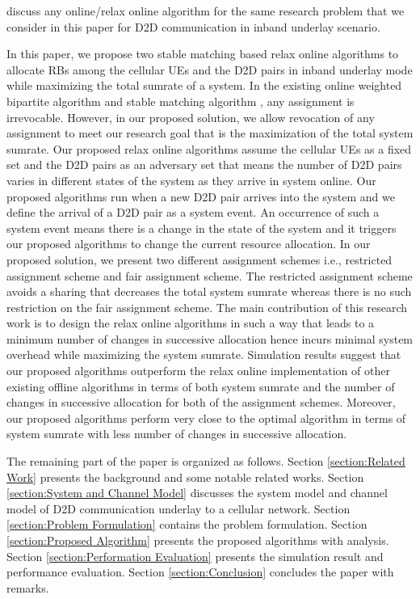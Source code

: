\documentclass[times]{dacauth}
\begin{document}
discuss any online/relax online algorithm for the same research problem that we consider in this paper for D2D communication in inband underlay scenario.

\smallskip 
\noindent
In this paper, we propose two stable matching \cite{knuth1976mariages} based relax online algorithms to allocate RBs among the cellular UEs and the D2D pairs in inband underlay mode while maximizing the total sumrate of a system. In the existing online   weighted bipartite algorithm \cite{karp1990optimal} and stable matching algorithm \cite{khuller1994line}, any assignment is irrevocable. However, in our proposed solution, we allow revocation of any assignment to meet our research goal that is the maximization of the total system sumrate. Our proposed relax online algorithms assume the cellular UEs as a fixed set and the D2D pairs as an adversary set that means the number of D2D pairs varies in different states of the system as they arrive in system online. Our proposed algorithms run when a new D2D pair arrives into the system and we define the arrival of a D2D pair as a system event. An occurrence of such a system event means there is a change in the state of the system and it triggers our proposed algorithms to change the current resource allocation. In our proposed solution, we present two different assignment schemes i.e., restricted assignment scheme and fair assignment scheme. The restricted assignment scheme avoids a sharing that decreases the total system sumrate whereas there is no such restriction on the fair assignment scheme. The main contribution of this research work is to design the relax online algorithms in such a way that leads to a minimum number of changes in successive allocation hence incurs minimal system overhead while maximizing the system sumrate. Simulation results suggest that our proposed algorithms outperform the relax online implementation of other existing offline algorithms in terms of both system sumrate and the number of changes in successive allocation for both of the assignment schemes. Moreover, our proposed algorithms perform very close to the optimal algorithm \cite{hungarian} in terms of system sumrate with less number of changes in successive allocation.

\smallskip 
\noindent
The remaining part of the paper is organized as follows. Section \ref{section:Related Work} presents the background and some notable related works. Section \ref{section:System and Channel Model} discusses the system model and channel model of D2D communication underlay to a cellular network. Section \ref{section:Problem Formulation} contains the problem formulation. Section \ref{section:Proposed Algorithm} presents the proposed algorithms with analysis. Section \ref{section:Performation Evaluation} presents the simulation result and performance evaluation. Section \ref{section:Conclusion} concludes the paper with remarks.
\end{document}
